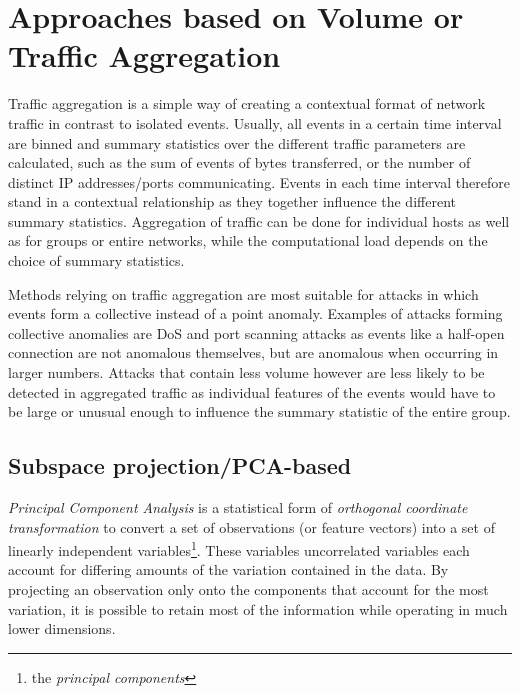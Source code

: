 \documentclass[a4paper,12pt,twoside]{report}
\begin{document}

\section{Approaches based on Volume or Traffic Aggregation}

Traffic aggregation is a simple way of creating a contextual format of network traffic in contrast to isolated events. Usually, all events in a certain time interval are binned and summary statistics over the different traffic parameters are calculated, such as the sum of events of bytes transferred, or the number of distinct IP addresses/ports communicating. Events in each time interval therefore stand in a contextual relationship as they together influence the different summary statistics.  Aggregation of traffic can be done for individual hosts as well as for groups or entire networks, while the computational load depends on the choice of summary statistics. 

Methods relying on traffic aggregation are most suitable for attacks in which events form a collective instead of a point anomaly. Examples  of attacks forming collective anomalies are DoS and port scanning attacks as events like a half-open connection are not anomalous themselves, but are anomalous when occurring in larger numbers. Attacks that contain less volume however are less likely to be detected in aggregated traffic as individual features of the events would have to be large or unusual enough to influence the summary statistic of the entire group.


\subsection{Subspace projection/PCA-based}

\textit{Principal Component Analysis} is a statistical form of \textit{orthogonal coordinate transformation} to convert a set of observations (or feature vectors) into a set of linearly independent variables\footnote{the \textit{principal components}}. These variables uncorrelated variables each account for differing amounts of the variation contained in the data. By projecting an observation only onto the components that account for the most variation, it is possible to retain most of the information while operating in much lower dimensions.
\end{document}
